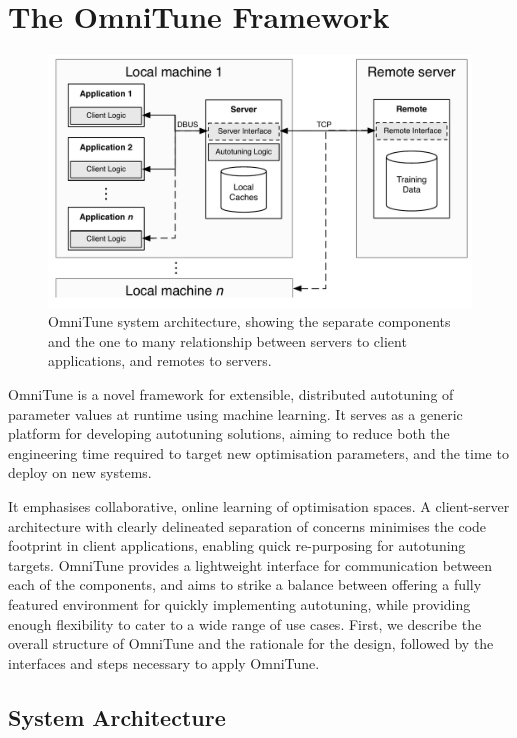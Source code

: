 \documentclass[nonatbib,preprint,9pt]{sigplanconf}
\begin{document}
\section{The OmniTune Framework}\label{sec:autotune}

\begin{figure}
\centering
\includegraphics[width=.98\columnwidth]{img/omnitune-system-overview.pdf}
\caption{%
  OmniTune system architecture, showing the separate components and
  the one to many relationship between servers to client applications,
  and remotes to servers.%
}
\label{fig:omnitune-system-overview}
\end{figure}

OmniTune is a novel framework for extensible, distributed autotuning
of parameter values at runtime using machine learning. It serves as a
generic platform for developing autotuning solutions, aiming to reduce
both the engineering time required to target new optimisation
parameters, and the time to deploy on new systems.

It emphasises collaborative, online learning of optimisation spaces. A
client-server architecture with clearly delineated separation of
concerns minimises the code footprint in client applications, enabling
quick re-purposing for autotuning targets. OmniTune provides a
lightweight interface for communication between each of the
components, and aims to strike a balance between offering a fully
featured environment for quickly implementing autotuning, while
providing enough flexibility to cater to a wide range of use
cases. First, we describe the overall structure of OmniTune and the
rationale for the design, followed by the interfaces and steps
necessary to apply OmniTune.


\subsection{System Architecture}
\end{document}
